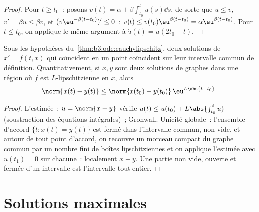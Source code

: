 \begin{proof}
Pour $t \geq t_0$~: posons $v(t) = \alpha +
\beta\int_{t_0}^tu(s)\dd s$, de sorte que $u \leq v$,
$v' = \beta u \leq \beta v$, et
$(v\eu^{-\beta(t - t_0)})' \leq 0$~: $v(t) \leq
v(t_0)\eu^{\beta(t-t_0)} = \alpha\eu^{\beta(t - t_0)}$. Pour
$t \leq t_0$, on applique le même argument à
$\tilde u(t) = u(2t_0 - t)$.
\end{proof}

\begin{corollary}
\label{cor:b3:ode:uniqueness}
Sous les hypothèses du~\cref{thm:b3:ode:cauchylipschitz}, deux
solutions de $x' = f(t,x)$ qui coïncident en un point
coïncident sur leur intervalle commun de définition.
Quantitativement, si $x, y$ sont deux solutions de graphes
 dans une région où $f$ est $L$-lipschitzienne en $x$,
alors
\[
\norm{x(t) - y(t)} \leq \norm{x(t_0) -
y(t_0)}\,\eu^{L\abs{t - t_0}} .
\]
\end{corollary}

\begin{proof}
L'estimée~: $u = \norm{x - y}$ vérifie $u(t) \leq u(t_0)
+ L\abs{\int_{t_0}^tu}$ (soustraction des équations
intégrales)~; Gronwall. Unicité globale~: l'ensemble
d'accord $\{t : x(t) = y(t)\}$ est fermé dans l'intervalle
commun, non vide, et  --- autour de tout point
d'accord, on recouvre un morceau compact du graphe commun par
un nombre fini de boîtes lipschitziennes et on applique
l'estimée avec $u(t_1) = 0$ sur chacune~: localement
$x \equiv y$. Une partie non vide, ouverte et fermée d'un
intervalle est l'intervalle tout entier.
\end{proof}

\section{Solutions maximales}

